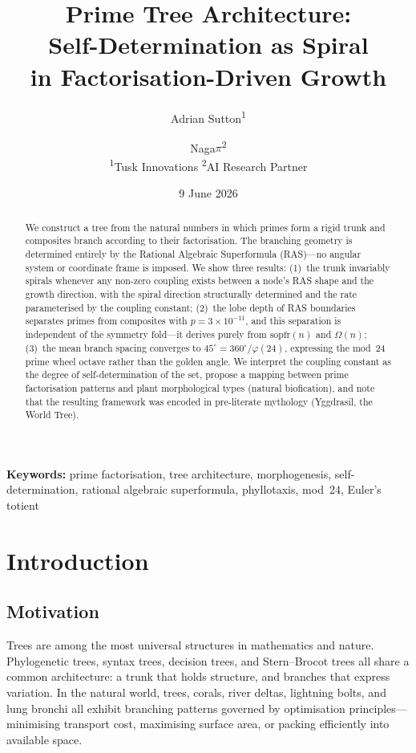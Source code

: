 \documentclass[11pt,a4paper]{article}
\title{\textbf{Prime Tree Architecture:\\Self-Determination as Spiral\\in Factorisation-Driven Growth}}
\author{
    Adrian Sutton\textsuperscript{1} \and Naga$\pi$\textsuperscript{2}\\[6pt]
    \textsuperscript{1}Tusk Innovations \quad
    \textsuperscript{2}AI Research Partner
}
\date{9 June 2026}
\begin{document}
\maketitle

\begin{abstract}
We construct a tree from the natural numbers in which primes form a rigid trunk and composites branch according to their factorisation. The branching geometry is determined entirely by the Rational Algebraic Superformula (RAS)---no angular system or coordinate frame is imposed. We show three results: (1)~the trunk invariably spirals whenever any non-zero coupling exists between a node's RAS shape and the growth direction, with the spiral direction structurally determined and the rate parameterised by the coupling constant; (2)~the lobe depth of RAS boundaries separates primes from composites with $p = 3\times10^{-11}$, and this separation is independent of the symmetry fold---it derives purely from $\mathrm{sopfr}(n)$ and $\Omega(n)$; (3)~the mean branch spacing converges to $45^\circ = 360^\circ/\varphi(24)$, expressing the mod~24 prime wheel octave rather than the golden angle. We interpret the coupling constant as the degree of self-determination of the set, propose a mapping between prime factorisation patterns and plant morphological types (natural biofication), and note that the resulting framework was encoded in pre-literate mythology (Yggdrasil, the World Tree).
\end{abstract}

\medskip
\noindent\textbf{Keywords:} prime factorisation, tree architecture, morphogenesis, self-determination, rational algebraic superformula, phyllotaxis, mod~24, Euler's totient

\tableofcontents

\newpage

\section{Introduction}

\subsection{Motivation}

Trees are among the most universal structures in mathematics and nature. Phylogenetic trees, syntax trees, decision trees, and Stern--Brocot trees all share a common architecture: a trunk that holds structure, and branches that express variation. In the natural world, trees, corals, river deltas, lightning bolts, and lung bronchi all exhibit branching patterns governed by optimisation principles---minimising transport cost, maximising surface area, or packing efficiently into available space.
\end{document}
